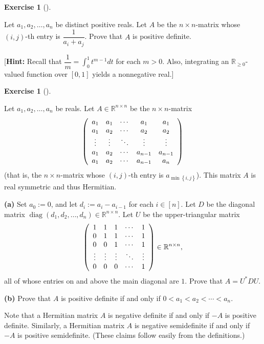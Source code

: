 \documentclass[numbers=enddot,12pt,final,onecolumn,notitlepage]{scrartcl}%
\newcounter{exer}
\numberwithin{exer}{subsection}
\theoremstyle{definition}
\newtheorem{exmp}[exer]{Exercise}
\newenvironment{exercise}[1][]
{\begin{exmp}[#1]\begin{leftbar}}
{\end{leftbar}\end{exmp}}
\begin{document}
\begin{exercise}
 Let $a_{1},a_{2},\ldots,a_{n}$ be distinct positive reals. Let $A$ be
the $n\times n$-matrix whose $\left(  i,j\right)  $-th entry is $\dfrac
{1}{a_{i}+a_{j}}$. Prove that $A$ is positive definite. \medskip

[\textbf{Hint:} Recall that $\dfrac{1}{m}=\int_{0}^{1}t^{m-1}dt$ for each
$m>0$. Also, integrating an $\mathbb{R}_{\geq0}$-valued function over $\left[
0,1\right]  $ yields a nonnegative real.]
\end{exercise}

\begin{exercise}
 Let $a_{1},a_{2},\ldots,a_{n}$ be reals. Let $A\in\mathbb{R}^{n\times
n}$ be the $n\times n$-matrix%
\[
\left(
\begin{array}
[c]{ccccc}%
a_{1} & a_{1} & \cdots & a_{1} & a_{1}\\
a_{1} & a_{2} & \cdots & a_{2} & a_{2}\\
\vdots & \vdots & \ddots & \vdots & \vdots\\
a_{1} & a_{2} & \cdots & a_{n-1} & a_{n-1}\\
a_{1} & a_{2} & \cdots & a_{n-1} & a_{n}%
\end{array}
\right)
\]
(that is, the $n\times n$-matrix whose $\left(  i,j\right)  $-th entry is
$a_{\min\left\{  i,j\right\}  }$). This matrix $A$ is real symmetric and thus
Hermitian. \medskip

\textbf{(a)} Set $a_{0}:=0$, and let $d_{i}:=a_{i}-a_{i-1}$ for each
$i\in\left[  n\right]  $. Let $D$ be the diagonal matrix $\operatorname*{diag}%
\left(  d_{1},d_{2},\ldots,d_{n}\right)  \in\mathbb{R}^{n\times n}$. Let $U$
be the upper-triangular matrix
\[
\left(
\begin{array}
[c]{ccccc}%
1 & 1 & 1 & \cdots & 1\\
0 & 1 & 1 & \cdots & 1\\
0 & 0 & 1 & \cdots & 1\\
\vdots & \vdots & \vdots & \ddots & \vdots\\
0 & 0 & 0 & \cdots & 1
\end{array}
\right)  \in\mathbb{R}^{n\times n},
\]
all of whose entries on and above the main diagonal are $1$. Prove that
$A=U^{\ast}DU$. \medskip

\textbf{(b)} Prove that $A$ is positive definite if and only if $0<a_{1}%
<a_{2}<\cdots<a_{n}$.
\end{exercise}

Note that a Hermitian matrix $A$ is negative definite if and only if $-A$ is
positive definite. Similarly, a Hermitian matrix $A$ is negative semidefinite
if and only if $-A$ is positive semidefinite. (These claims follow easily from
the definitions.)
\end{document}
